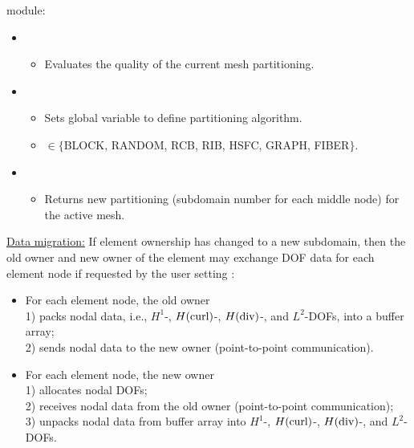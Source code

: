  module:
\begin{itemize}
	\item {}
	\begin{itemize}
		\item Evaluates the quality of the current mesh partitioning.
	\end{itemize}
	\item {}
	\begin{itemize}
		\item Sets global variable  to define partitioning algorithm.
		\item {} $\in \{$BLOCK, RANDOM, RCB, RIB, HSFC, GRAPH, FIBER$\}$.
	\end{itemize}
	\item {}
	\begin{itemize}
		\item Returns new partitioning (subdomain number for each middle node) for the active mesh.
	\end{itemize}
\end{itemize}


\underline{Data migration:} If element ownership has changed to a new subdomain, then the old owner and new owner of the element may exchange DOF data for each element node if requested by the user setting :
\begin{itemize}
	\item For each element node, the old owner\\
	1) packs nodal data, i.e., $H^1$-, $H(\text{curl})$-, $H(\text{div})$-, and $L^2$-DOFs, into a buffer array;\\
	2) sends nodal data to the new owner (point-to-point communication).
	\item For each element node, the new owner\\
	1) allocates nodal DOFs;\\
	2) receives nodal data from the old owner (point-to-point communication);\\
	3) unpacks nodal data from buffer array into $H^1$-, $H(\text{curl})$-, $H(\text{div})$-, and $L^2$-DOFs.
\end{itemize}


%


